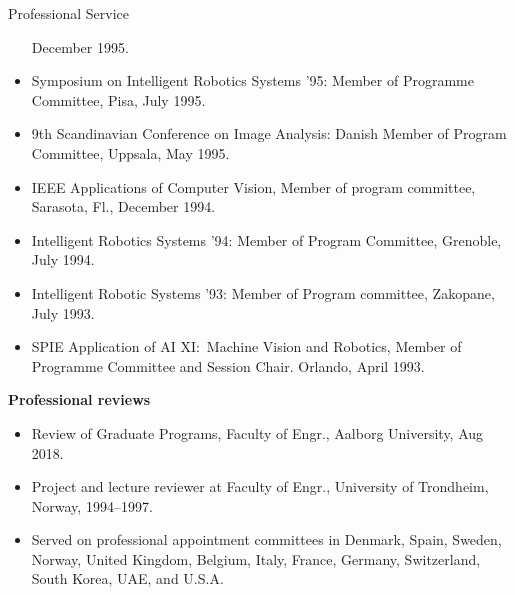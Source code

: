 \documentclass{article}
\begin{document}
\begin{cv}
\begin{cvlist}{Professional Service}
\begin{itemize}
          December 1995.
    \item Symposium on Intelligent Robotics Systems '95: Member of Programme
          Committee, Pisa, July 1995.
    \item 9th Scandinavian Conference on Image Analysis: Danish Member of Program
          Committee, Uppsala, May 1995.
    \item IEEE Applications of Computer Vision, Member of program committee,
          Sarasota, Fl., December 1994.
    \item Intelligent Robotics Systems '94: Member of Program Committee, Grenoble,
          July 1994.
    \item Intelligent Robotic Systems '93: Member of Program committee, Zakopane,
          July 1993.
    \item SPIE Application of AI XI:\ Machine Vision and Robotics, Member of
          Programme Committee and Session Chair. Orlando, April 1993.
\end{itemize}

\item {\bf Professional reviews}
  \begin{itemize}
    \item Review of Graduate Programs, Faculty of Engr., Aalborg University, Aug
          2018.
    \item Project and lecture reviewer at Faculty of Engr., University of Trondheim,
          Norway, 1994--1997.
    \item Served on professional appointment committees in Denmark, Spain, Sweden,
          Norway, United Kingdom, Belgium, Italy, France, Germany, Switzerland,
          South Korea, UAE, and U.S.A.
  \end{itemize}


\end{cvlist}
\end{cv}
\end{document}

